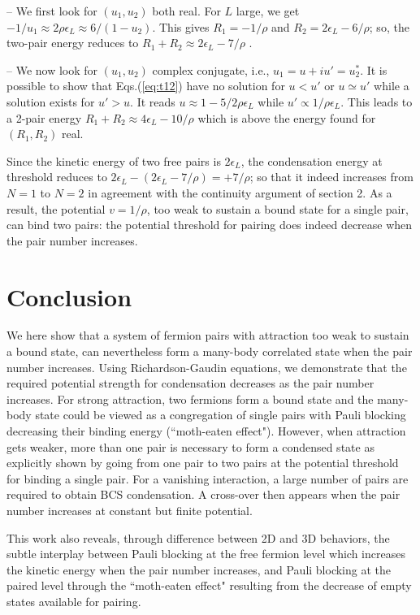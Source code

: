 \documentclass[5p,twocolumn]{elsarticle}
\begin{document}
-- We first look for $(u_1,u_2)$ both real. For $L$ large, we get $-1/u_1\approx 2 \rho\epsilon_L \approx 6/(1-u_2)$. This gives $R_1=-1/\rho$ and $R_2=2 \epsilon_L-6/\rho$; so, the two-pair energy reduces to $R_1+R_2\approx2 \epsilon_L-7/\rho$ .

--  We now look for $(u_1,u_2)$ complex conjugate, i.e., $u_1=u+iu'=u^*_2$. It is possible to show that Eqs.(\ref{eq:t12}) have no solution for $u<u'$ or $u\simeq u'$ while a solution exists for $u'>u$. It reads $u\approx1-5/2\rho\epsilon_L$ while $u'\propto1/\rho\epsilon_L$. This leads to a 2-pair energy $R_1+R_2\approx4 \epsilon_L-10/\rho$ which is above the energy found for $(R_1,R_2)$ real.

Since the kinetic energy of two free pairs is $2\epsilon_L$, the condensation energy at threshold reduces to 
$ 2\epsilon_L-(2 \epsilon_L-7/\rho)=+7/\rho$; so that it indeed increases from $N=1$ to $N=2$ in agreement with the continuity argument of section 2. As a result, the potential $v=1/\rho$, too weak to sustain a bound state for a single pair, can bind two pairs: the potential threshold for pairing does indeed decrease when the pair number increases.

 

\section{Conclusion\label{sec:conclusion}}
We here show that a system of fermion pairs with attraction too weak to sustain a bound state, can nevertheless form a many-body correlated state when the pair number increases.  Using Richardson-Gaudin equations, we demonstrate that the required potential strength for condensation decreases as the pair number increases.  For strong attraction, two fermions form a bound state and the many-body state could be viewed as a congregation of single pairs with Pauli blocking decreasing their binding energy (``moth-eaten effect").  However, when attraction gets weaker, more than one pair is necessary to form a condensed state as explicitly shown by going from one pair to two pairs at the potential threshold for binding a single pair.  For a vanishing interaction, a large number of pairs are required to obtain BCS condensation.   A cross-over then appears when the pair number increases at constant but finite potential.

 This work also reveals, through difference between 2D and 3D behaviors, the subtle interplay between Pauli blocking at the free fermion level which increases the kinetic energy when the pair number increases, and Pauli blocking at the paired level through the ``moth-eaten effect" resulting from the decrease of empty states available for pairing.
\end{document}
